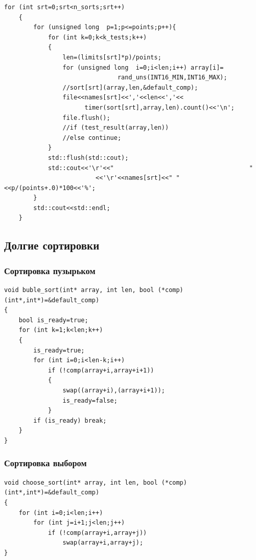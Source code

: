 \documentclass[12pt,a4paper]{article}
\begin{document}
\begin{verbatim}
for (int srt=0;srt<n_sorts;srt++)
    {
        for (unsigned long  p=1;p<=points;p++){
            for (int k=0;k<k_tests;k++)
            {
                len=(limits[srt]*p)/points;
                for (unsigned long  i=0;i<len;i++) array[i]=
                               rand_uns(INT16_MIN,INT16_MAX);
                //sort[srt](array,len,&default_comp);
                file<<names[srt]<<','<<len<<','<<
                      timer(sort[srt],array,len).count()<<'\n';
                file.flush();
                //if (test_result(array,len)) 
                //else continue;
            }
            std::flush(std::cout);
            std::cout<<'\r'<<"                                     "
                         <<'\r'<<names[srt]<<" "<<p/(points+.0)*100<<'%';
        }
        std::cout<<std::endl;
    }
\end{verbatim}

\newpage
\subsection{ Долгие сортировки}

\subsubsection{ Сортировка пузырьком}
\begin{verbatim}
void buble_sort(int* array, int len, bool (*comp)(int*,int*)=&default_comp)
{
    bool is_ready=true;
    for (int k=1;k<len;k++)
    {
        is_ready=true;
        for (int i=0;i<len-k;i++)
            if (!comp(array+i,array+i+1))
            {
                swap((array+i),(array+i+1)); 
                is_ready=false;
            }
        if (is_ready) break;
    }
}
\end{verbatim}

\subsubsection{ Сортировка выбором}
\begin{verbatim}
void choose_sort(int* array, int len, bool (*comp)(int*,int*)=&default_comp)
{
    for (int i=0;i<len;i++)
        for (int j=i+1;j<len;j++)
            if (!comp(array+i,array+j))
                swap(array+i,array+j);
}
\end{verbatim}
\end{document}
